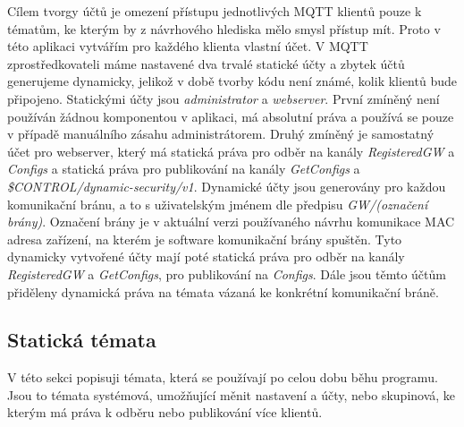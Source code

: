 Cílem tvorgy účtů je omezení přístupu jednotlivých MQTT klientů pouze k tématům, ke kterým by z návrhového hlediska mělo smysl přístup mít. Proto v této aplikaci vytvářím pro každého klienta vlastní účet. V MQTT zprostředkovateli máme nastavené dva trvalé statické účty a zbytek účtů generujeme dynamicky, jelikož v době tvorby kódu není známé, kolik klientů bude připojeno. 
Statickými účty jsou \emph{administrator} a \emph{webserver}. První zmíněný není používán žádnou komponentou v aplikaci, má absolutní práva a používá se pouze v případě manuálního zásahu administrátorem. Druhý zmíněný je samostatný účet pro webserver, který má statická práva pro odběr na kanály \emph{RegisteredGW} a \emph{Configs} a statická práva pro publikování na kanály \emph{GetConfigs} a \emph{\$CONTROL/dynamic-security/v1}.
Dynamické účty jsou generovány pro každou komunikační bránu, a to s uživatelským jménem dle předpisu \emph{GW/(označení brány)}. Označení brány je v aktuální verzi používaného návrhu komunikace MAC adresa zařízení, na kterém je software komunikační brány spuštěn. Tyto dynamicky vytvořené účty mají poté statická práva pro odběr na kanály \emph{RegisteredGW} a \emph{GetConfigs}, pro publikování na \emph{Configs}. Dále jsou těmto účtům přiděleny dynamická práva na témata vázaná ke konkrétní komunikační bráně.

\subsection{Statická témata}

V této sekci popisuji témata, která se používají po celou dobu běhu programu. Jsou to témata systémová, umožňující měnit nastavení a účty, nebo skupinová, ke kterým má práva k odběru nebo publikování více klientů.

